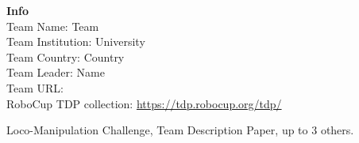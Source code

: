 \documentclass[journal]{IEEEtran}
\begin{document}







\maketitle




\begin{flushleft}
\textbf{Info}\\
\hspace{10pt} Team Name: \hfill Team\\
\hspace{10pt} Team Institution: \hfill University\\
\hspace{10pt} Team Country: \hfill Country\\
\hspace{10pt} Team Leader: \hfill Name\\
\hspace{10pt} Team URL: \hfill %
\\
\vspace{5pt}
\hspace{10pt} RoboCup TDP collection: 
 \url{https://tdp.robocup.org/tdp/}
\end{flushleft}

\begin{abstract}
The abstract goes here. A brief summary of your robot, its main capabilities and what sets it apart from the competitors.
\end{abstract}

\begin{IEEEkeywords}
Loco-Manipulation Challenge, Team Description Paper, up to 3 others.
\end{IEEEkeywords}
\end{document}
